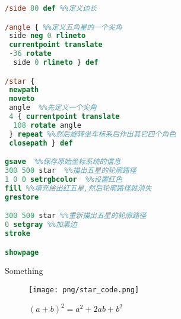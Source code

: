 \documentclass[main.tex]{subfiles}
\begin{document}
\begin{spacing}{0.8}
\begin{lstlisting}[language=PostScript]
%!PS-Adobe-3.0
/side 80 def %%定义边长 

/angle { %%定义五角星的一个尖角
 side neg 0 rlineto
 currentpoint translate
 -36 rotate
  side 0 rlineto } def

/star {
 newpath
 moveto
 angle  %%先定义一个尖角
 4 { currentpoint translate
  108 rotate angle 
 } repeat %%然后旋转坐车标系后作出其它四个角色
 closepath } def

gsave  %%保存原始坐标系统的信息
300 500 star  %%描出五星的轮廓路径
1 0 0 setrgbcolor  %%设置红色
fill %%填充绘出红五星,然后轮廓路径就消失
grestore

300 500 star %%重新描出五星的轮廓路径
0 setgray %%加黑边
stroke

showpage
\end{lstlisting}
\end{spacing}



Something
\begin{figure}[h]
	\centering
	\texttt{[image: png/star\_code.png]}
	\caption{$(a+b)^2 = a^2 + 2ab + b^2$}
	\label{fig:III.1.3}
\end{figure}
\end{document}
